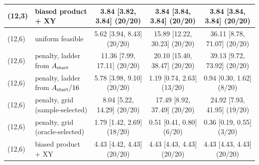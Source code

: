 \begin{table}[t]
{\begin{tabular}{llccc}
(12,3) & biased product + XY & 3.84 [3.82, 3.84] (20/20) & 3.84 [3.84, 3.84] (20/20) & 3.84 [3.84, 3.84] (20/20)\\
\midrule
(12,6) & uniform feasible & 5.62 [3.94, 8.43] (20/20) & 15.89 [12.22, 30.23] (20/20) & 36.11 [8.78, 71.07] (20/20)\\
(12,6) & penalty, ladder from $A_{\rm start}$ & 11.36 [7.99, 17.11] (20/20) & 20.10 [15.40, 38.47] (20/20) & 39.13 [9.72, 73.92] (20/20)\\
(12,6) & penalty, ladder from $A_{\rm start}/16$ & 5.78 [3.98, 9.10] (20/20) & 1.19 [0.74, 2.63] (13/20) & 0.94 [0.30, 1.62] (8/20)\\
(12,6) & penalty, grid (sample-selected) & 8.04 [5.22, 14.29] (20/20) & 17.49 [8.92, 37.49] (20/20) & 24.92 [7.93, 41.95] (19/20)\\
(12,6) & penalty, grid (oracle-selected) & 1.79 [1.42, 2.69] (18/20) & 0.51 [0.41, 0.80] (6/20) & 0.36 [0.19, 0.55] (3/20)\\
(12,6) & biased product + XY & 4.43 [4.42, 4.43] (20/20) & 4.43 [4.43, 4.43] (20/20) & 4.43 [4.43, 4.43] (20/20)\\
\bottomrule\end{tabular}}\end{table}
